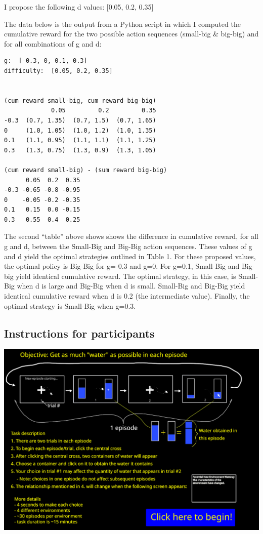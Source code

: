 \documentclass[11pt]{article}
\begin{document}
I propose the following d values: [0.05, 0.2, 0.35]

The data below is the output from a Python script in which I computed the cumulative reward for the two possible action sequences (small-big \& big-big) and for all combinations of g and d:

\label{}
\begin{verbatim}
g:  [-0.3, 0, 0.1, 0.3]
difficulty:  [0.05, 0.2, 0.35]


(cum reward small-big, cum reward big-big)
             0.05         0.2         0.35
-0.3  (0.7, 1.35)  (0.7, 1.5)  (0.7, 1.65)
0     (1.0, 1.05)  (1.0, 1.2)  (1.0, 1.35)
0.1   (1.1, 0.95)  (1.1, 1.1)  (1.1, 1.25)
0.3   (1.3, 0.75)  (1.3, 0.9)  (1.3, 1.05) 

(cum reward small-big) - (sum reward big-big)
      0.05  0.2  0.35
-0.3 -0.65 -0.8 -0.95
0    -0.05 -0.2 -0.35
0.1   0.15  0.0 -0.15
0.3   0.55  0.4  0.25
\end{verbatim}

The second ``table'' above shows shows the difference in cumulative reward, for all g and d, between the Small-Big and Big-Big action sequences. These values of g and d yield the optimal strategies outlined in Table 1. For these proposed values, the optimal policy is Big-Big for g=-0.3 and g=0. For g=0.1, Small-Big and Big-big yield identical cumulative reward.  The optimal strategy, in this case, is Small-Big when d is large and Big-Big when d is small. Small-Big and Big-Big yield identical cumulative reward when d is 0.2 (the intermediate value). Finally, the optimal strategy is Small-Big when g=0.3.
\subsection{Instructions for participants}
\label{sec:orgd213489}
\begin{center}
\includegraphics[width=.9\linewidth]{./img/instructions.png}
\end{center}
\end{document}
